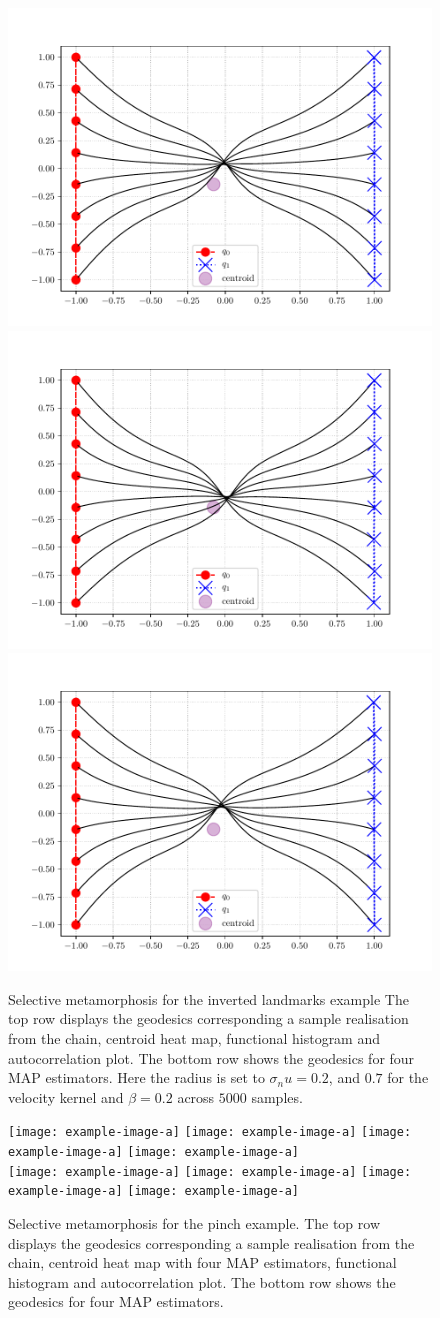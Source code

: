 \documentclass[runningheads]{llncs}
\begin{document}
\begin{figure}
\begin{minipage}{\textwidth}
    \includegraphics[width=.23\textwidth]{../results/results_criss_cross/MAP_center_1.pdf}
    \includegraphics[width=.23\textwidth]{../results/results_criss_cross/MAP_center_2.pdf}
    \includegraphics[width=.23\textwidth]{../results/results_criss_cross/MAP_center_3.pdf}
    \caption{Selective metamorphosis for the inverted landmarks example The top
    row displays the geodesics corresponding a sample realisation from the
    chain, centroid heat map, functional histogram and
    autocorrelation plot. The bottom row shows the geodesics for four MAP
    estimators. Here the radius is set to $\sigma_nu = 0.2$, and $0.7$ for the
    velocity kernel and $\beta=0.2$ across $5000$ samples.}
    \label{fig:selective:crisscross}
\end{minipage}
\end{figure}
\begin{figure}
\centering
\begin{minipage}{\textwidth}
  \centering
    \texttt{[image: example-image-a]}\quad
    \texttt{[image: example-image-a]}\quad
    \texttt{[image: example-image-a]}\quad
    \texttt{[image: example-image-a]}\\[0.25cm]
    \texttt{[image: example-image-a]}\quad
    \texttt{[image: example-image-a]}\quad
    \texttt{[image: example-image-a]}\quad
    \texttt{[image: example-image-a]}
    \caption{Selective metamorphosis for the pinch example. The top row displays
    the geodesics corresponding a sample realisation from the chain, centroid
    heat map with four MAP estimators, functional histogram and autocorrelation
    plot. The bottom row shows the geodesics for four MAP estimators.}
    \label{fig:selective:pinch}
\end{minipage}
\end{figure}
\end{document}
